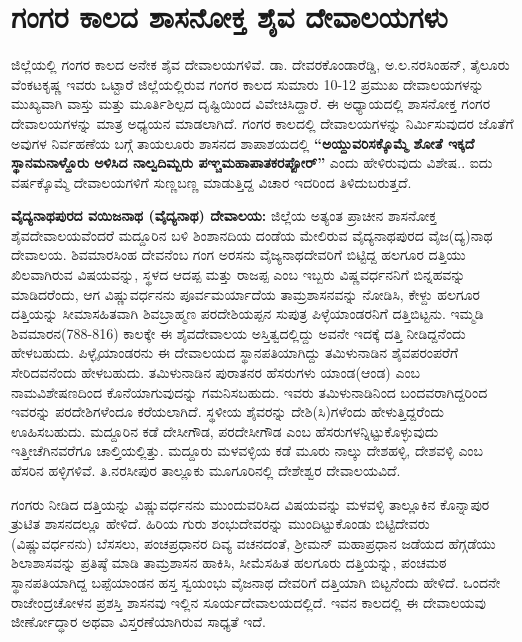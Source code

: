 \section*{ಗಂಗರ ಕಾಲದ ಶಾಸನೋಕ್ತ ಶೈವ ದೇವಾಲಯಗಳು}

ಜಿಲ್ಲೆಯಲ್ಲಿ ಗಂಗರ ಕಾಲದ ಅನೇಕ ಶೈವ ದೇವಾಲಯಗಳಿವೆ. ಡಾ. ದೇವರಕೊಂಡಾರೆಡ್ಡಿ, ಅ.ಲ.ನರಸಿಂಹನ್​, ತೈಲೂರು ವೆಂಕಟಕೃಷ್ಣ ಇವರು ಒಟ್ಟಾರೆ ಜಿಲ್ಲೆಯಲ್ಲಿರುವ ಗಂಗರ ಕಾಲದ ಸುಮಾರು 10-12 ಪ್ರಮುಖ ದೇವಾಲಯಗಳನ್ನು ಮುಖ್ಯವಾಗಿ ವಾಸ್ತು ಮತ್ತು ಮೂರ್ತಿಶಿಲ್ಪದ ದೃಷ್ಟಿಯಿಂದ ವಿವೇಚಿಸಿದ್ದಾರೆ. ಈ ಅಧ್ಯಾಯದಲ್ಲಿ ಶಾಸನೋಕ್ತ ಗಂಗರ ದೇವಾಲಯಗಳನ್ನು ಮಾತ್ರ ಅಧ್ಯಯನ ಮಾಡಲಾಗಿದೆ. ಗಂಗರ ಕಾಲದಲ್ಲಿ ದೇವಾಲಯಗಳನ್ನು ನಿರ್ಮಿಸುವುದರ ಜೊತೆಗೆ ಅವುಗಳ ನಿರ್ವಹಣೆಯ ಬಗ್ಗೆ ತಾಯಲೂರು ಶಾಸನದ ಶಾಪಾಶಯದಲ್ಲಿ \textbf{“ಅಯ್ದುವರಿಸಕ್ಕೊಮ್ಮೆ ಶೋತೆ ಇಕ್ಕದೆ ಸ್ಥಾನಮನಾಳ್ದೊರು ಅಳಿಸಿದ ನಾಲ್ವದಿಮ್ಬರು ಪಞ್ಚಮಹಾಪಾತಕರಪ್ಪೋರ್​”} ಎಂದು ಹೇಳಿರುವುದು ವಿಶೇಷ.. ಐದು ವರ್ಷಕ್ಕೊಮ್ಮೆ ದೇವಾಲಯಗಳಿಗೆ ಸುಣ್ಣಬಣ್ಣ ಮಾಡುತ್ತಿದ್ದ ವಿಚಾರ ಇದರಿಂದ ತಿಳಿದುಬರುತ್ತದೆ.

\textbf{ವೈದ್ಯನಾಥಪುರದ ವಯಿಜನಾಥ (ವೈದ್ಯನಾಥ) ದೇವಾಲಯ: } ಜಿಲ್ಲೆಯ ಅತ್ಯಂತ ಪ್ರಾಚೀನ ಶಾಸನೋಕ್ತ ಶೈವ\-ದೇವಾ\-ಲಯವೆಂದರೆ ಮದ್ದೂರಿನ ಬಳಿ ಶಿಂಶಾನದಿಯ ದಂಡೆಯ ಮೇಲಿರುವ ವೈದ್ಯನಾಥಪುರದ ವೈಜ(ದ್ಯ)ನಾಥ ದೇವಾಲಯ. ಶಿವಮಾರಸಿಂಹ ದೇವನೆಂಬ ಗಂಗ ಅರಸನು ವೈಜ್ಯನಾಥದೇವರಿಗೆ ಬಿಟ್ಟಿದ್ದ ಹಲಗೂರ ದತ್ತಿಯು ಖಿಲವಾಗಿರುವ ವಿಷಯವನ್ನು, ಸ್ಥಳದ ಆದಪ್ಪ ಮತ್ತು ರಾಜಪ್ಪ ಎಂಬ ಇಬ್ಬರು ವಿಷ್ಣವರ್ಧನನಿಗೆ ಬಿನ್ನಹವನ್ನು ಮಾಡಿದರೆಂದು, ಆಗ ವಿಷ್ಣುವರ್ಧನನು ಪೂರ್ವಮರ್ಯಾದೆಯ ತಾಮ್ರಶಾಸನವನ್ನು ನೋಡಿಸಿ, ಕೇಳ್ದು ಹಲಗೂರ ದತ್ತಿಯನ್ನು ಸೀಮಾಸಹಿತವಾಗಿ ಶಿವಬ್ರಾಹ್ಮಣ ಪರದೇಶಿಯಪ್ಪನ ಸುಪುತ್ರ ಪಿಳ್ಳೆಯಾಂಡರನಿಗೆ ದತ್ತಿಬಿಟ್ಟನು. ಇಮ್ಮಡಿ ಶಿವಮಾರನ(788-816) ಕಾಲಕ್ಕೇ ಈ ಶೈವದೇವಾಲಯ ಅಸ್ತಿತ್ವದಲ್ಲಿದ್ದು ಅವನೇ ಇದಕ್ಕೆ ದತ್ತಿ ನೀಡಿದ್ದನೆಂದು ಹೇಳಬಹುದು. ಪಿಳ್ಳೈಯಾಂಡರನು ಈ ದೇವಾಲಯದ ಸ್ಥಾನಪತಿ\-ಯಾಗಿದ್ದು ತಮಿಳುನಾಡಿನ ಶೈವಪರಂಪರೆಗೆ ಸೇರಿದವನೆಂದು ಹೇಳಬಹುದು. ತಮಿಳುನಾಡಿನ ಪುರಾತನರ ಹೆಸರುಗಳು ಯಾಂಡ(ಆಂಡ) ಎಂಬ ನಾಮವಿಶೇಷಣದಿಂದ ಕೊನೆಯಾಗುವುದನ್ನು ಗಮನಿಸಬಹುದು. ಇವರು ತಮಿಳುನಾಡಿನಿಂದ ಬಂದವರಾಗಿದ್ದರಿಂದ ಇವರನ್ನು ಪರದೇಶಿಗಳೆಂದೂ ಕರೆಯಲಾಗಿದೆ. ಸ್ಥಳೀಯ ಶೈವರನ್ನು ದೇಶಿ(ಸಿ)ಗಳೆಂದು ಹೇಳುತ್ತಿದ್ದರೆಂದು ಊಹಿಸಬಹುದು. ಮದ್ದೂರಿನ ಕಡೆ ದೇಸೀಗೌಡ, ಪರದೇಸೀಗೌಡ ಎಂಬ ಹೆಸರುಗಳನ್ನಿಟ್ಟುಕೊಳ್ಳುವುದು ಇತ್ತೀಚೆಗಿನವರೆಗೂ ಚಾಲ್ತಿಯಲ್ಲಿತ್ತು. ಮದ್ದೂರು ಮಳವಳ್ಳಿಯ ಕಡೆ ಮೂರು ನಾಲ್ಕು ದೇಶಹಳ್ಳಿ, ದೇಶವಳ್ಳಿ ಎಂಬ ಹೆಸರಿನ ಹಳ್ಳಿಗಳಿವೆ. ತಿ.ನರಸೀಪುರ ತಾಲ್ಲೂಕು ಮೂಗೂರಿನಲ್ಲಿ ದೇಶೇಶ್ವರ ದೇವಾಲಯವಿದೆ.

ಗಂಗರು ನೀಡಿದ ದತ್ತಿಯನ್ನು ವಿಷ್ಣುವರ್ಧನನು ಮುಂದುವರಿಸಿದ ವಿಷಯವನ್ನು ಮಳವಳ್ಳಿ ತಾಲ್ಲೂಕಿನ ಕೊನ್ನಾಪುರ ತ್ರುಟಿತ ಶಾಸನದಲ್ಲೂ ಹೇಳಿದೆ. ಹಿರಿಯ ಗುರು ಶಂಭುದೇವರನ್ನು ಮುಂದಿಟ್ಟುಕೊಂಡು ಬಿಟ್ಟಿದೇವರು (ವಿಷ್ಣುವರ್ಧನನು) ಬೆಸಸಲು, ಪಂಚಪ್ರಧಾನರ ದಿವ್ಯ ವಚನದಂತೆ, ಶ‍್ರೀಮನ್​ ಮಹಾಪ್ರಧಾನ ಜಡೆಯದ ಹೆಗ್ಗಡೆಯು ಶಿಲಾಶಾಸವನ್ನು ಪ್ರತಿಷ್ಠೆ ಮಾಡಿ ತಾಮ್ರಶಾಸನ ಹಾಕಿಸಿ, ಸೀಮೆಸಹಿತ ಹಲಗೂರು ದತ್ತಿಯನ್ನು, ಪಂಚಮಠ ಸ್ಥಾನಪತಿಯಾಗಿದ್ದ ಬಪ್ಪೆಯಾಂಡನ ಹಸ್ತ ಸ್ವಯಂಭು ವೈಜನಾಥ ದೇವರಿಗೆ ದತ್ತಿಯಾಗಿ ಬಿಟ್ಟನೆಂದು ಹೇಳಿದೆ. ಒಂದನೇ ರಾಜೇಂದ್ರಚೋಳನ ಪ್ರಶಸ್ತಿ ಶಾಸನವು ಇಲ್ಲಿನ ಸೂರ್ಯದೇವಾಲಯದಲ್ಲಿದೆ. ಇವನ ಕಾಲದಲ್ಲಿ ಈ ದೇವಾಲಯವು ಜೀರ್ಣೋದ್ಧಾರ ಅಥವಾ ವಿಸ್ತರಣೆಯಾಗಿರುವ ಸಾಧ್ಯತೆ ಇದೆ.

